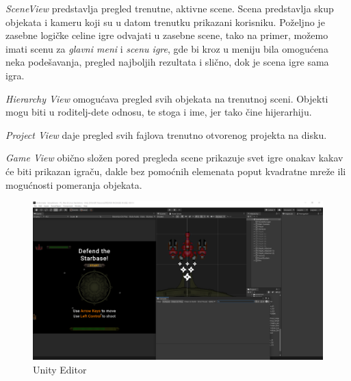 \emph{SceneView} predstavlja pregled trenutne, aktivne scene. Scena predstavlja skup
objekata i kameru koji su u datom trenutku prikazani korisniku. Po\v{z}eljno je zasebne
logi\v{c}ke celine igre odvajati u zasebne scene, tako na primer, mo\v{z}emo imati scenu
za \emph{glavni meni} i \emph{scenu igre}, gde bi kroz u meniju bila omogu\'cena neka pode\v{s}avanja,
pregled najboljih rezultata i sli\v{c}no, dok je scena igre sama igra.

\emph{Hierarchy View} omogu\'cava pregled svih objekata na trenutnoj sceni. Objekti mogu
biti u roditelj-dete odnosu, te stoga i ime, jer tako \v{c}ine hijerarhiju.

\emph{Project View} daje pregled svih fajlova trenutno otvorenog projekta na disku.

\emph{Game View} obi\v{c}no slo\v{z}en pored pregleda scene prikazuje svet igre
onakav kakav \'ce biti prikazan igra\v{c}u, dakle bez pomo\'cnih elemenata poput 
kvadratne mre\v{z}e ili mogu\'cnosti pomeranja objekata. 

\begin{center}
    \begin{figure}
        \includegraphics[width=1\textwidth]{Figures/Editor.png}
        \caption{Unity Editor}
        \label{fig:unityeditor}
    \end{figure}
\end{center}




